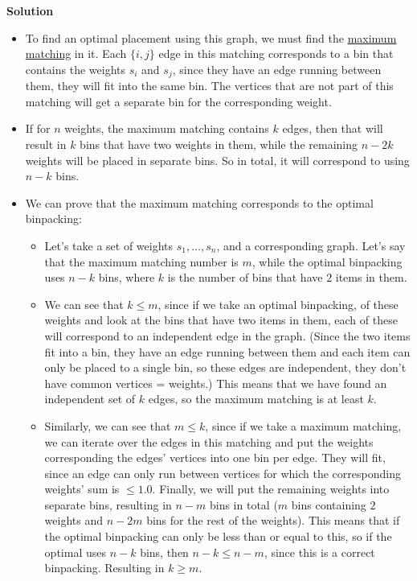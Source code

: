 \textbf{Solution}
\begin{itemize}
    \item To find an optimal placement using this graph, we must find the \href{https://en.wikipedia.org/wiki/Matching_(graph_theory)}{maximum matching} in it. Each $\{i,j\}$ edge in this matching corresponds to a bin that contains the weights $s_i$ and $s_j$, since they have an edge running between them, they will fit into the same bin. The vertices that are not part of this matching will get a separate bin for the corresponding weight.
    \item If for $n$ weights, the maximum matching contains $k$ edges, then that will result in $k$ bins that have two weights in them, while the remaining $n-2k$ weights will be placed in separate bins. So in total, it will correspond to using $n-k$ bins.
    \item We can prove that the maximum matching corresponds to the optimal binpacking:
    \begin{itemize}
        \item Let's take a set of weights $s_1, \dots{}, s_n$, and a corresponding graph. Let's say that the maximum matching number is $m$, while the optimal binpacking uses $n-k$ bins, where $k$ is the number of bins that have $2$ items in them.
        \item We can see that $k\leq{}m$, since if we take an optimal binpacking, of these weights and look at the bins that have two items in them, each of these will correspond to an independent edge in the graph. (Since the two items fit into a bin, they have an edge running between them and each item can only be placed to a single bin, so these edges are independent, they don't have common vertices = weights.) This means that we have found an independent set of $k$ edges, so the maximum matching is at least $k$.
        \item Similarly, we can see that $m\leq{}k$, since if we take a maximum matching, we can iterate over the edges in this matching and put the weights corresponding the edges' vertices into one bin per edge. They will fit, since an edge can only run between vertices for which the corresponding weights' sum is $\leq{}1.0$. Finally, we will put the remaining weights into separate bins, resulting in $n-m$ bins in total ($m$ bins containing $2$ weights and $n-2m$ bins for the rest of the weights). This means that if the optimal binpacking can only be less than or equal to this, so if the optimal uses $n-k$ bins, then $n-k\leq{}n-m$, since this is a correct binpacking. Resulting in $k\geq{}m$.

\end{itemize}
\end{itemize}
